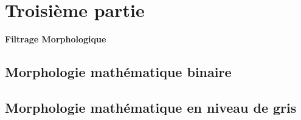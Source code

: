 \documentclass{scrreprt}
\begin{document}
\newpage
\chapter{Troisième partie}

\begin{center}
\large{
\textbf{Filtrage Morphologique}}
\end{center}

\section{Morphologie mathématique binaire}

\newpage
\section{Morphologie mathématique en niveau de gris}
\end{document}
